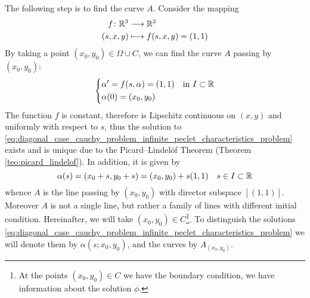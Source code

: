 The following step is to find the curve $A$. Consider the mapping 
\begin{equation}
	\begin{aligned}
		f \colon \mathbb{R}^3 &\longrightarrow \mathbb{R}^2 \\
		(s,x,y) &\longmapsto f(s,x,y) = (1,1)
	\end{aligned}
\end{equation}
By taking a point $(x_0, y_0) \in \Omega \cup C$, we can find the curve $A$
passing by $(x_0, y_0)$:
\begin{equation} \label{eq:diagonal_case_cauchy_problem_infinite_peclet_characteristics_problem}
	\left\{
		\begin{aligned}
			&\alpha' = f(s,\alpha) = (1,1) & &\text{in } I \subset \mathbb{R} \\
			&\alpha(0) = (x_0, y_0)
		\end{aligned}
	\right.
\end{equation}
The function $f$ is constant, therefore is Lipschitz continuous on $(x,y)$ and
uniformly with respect to $s$, thus the solution to
\eqref{eq:diagonal_case_cauchy_problem_infinite_peclet_characteristics_problem}
exists and is unique due to the Picard--Lindelöf Theorem (Theorem
\ref{teo:picard_lindelof}). In addition, it is given by
\begin{equation} \label{eq:diagonal_case_cauchy_problem_infinite_peclet_characteristics_solution}
	\alpha(s) = (x_0 + s, y_0 + s) = (x_0, y_0) + s(1, 1) \quad s \in I \subset \mathbb{R}
\end{equation}
whence $A$ is the line passing by $(x_0, y_0)$ with director subspace $[(1,
1)]$. Moreover $A$ is not a single line, but rather a family of lines with
different initial condition. Hereinafter, we will take $(x_0,y_0) \in
C$\footnote{At the points $(x_0,y_0) \in C$ we have the boundary condition, \ie
we have information about the solution $\phi$.}. To distinguish the solutions
\eqref{eq:diagonal_case_cauchy_problem_infinite_peclet_characteristics_problem}
we will denote them by $\alpha(s; x_0, y_0)$, and the curves by $A_{(x_0,y_0)}$.

